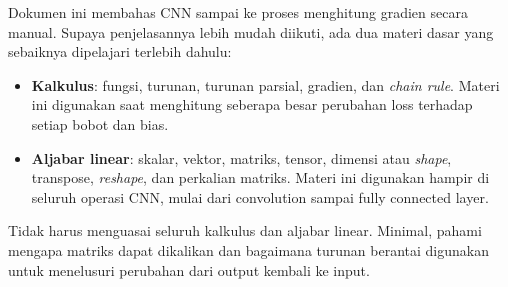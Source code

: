 \documentclass[12pt, letterpaper]{article}
\begin{document}
\begin{prasyaratbox}
Dokumen ini membahas CNN sampai ke proses menghitung gradien secara manual. Supaya penjelasannya lebih mudah diikuti, ada dua materi dasar yang sebaiknya dipelajari terlebih dahulu:
\begin{itemize}
    \item \textbf{Kalkulus}: fungsi, turunan, turunan parsial, gradien, dan \textit{chain rule}. Materi ini digunakan saat menghitung seberapa besar perubahan loss terhadap setiap bobot dan bias.
    \item \textbf{Aljabar linear}: skalar, vektor, matriks, tensor, dimensi atau \textit{shape}, transpose, \textit{reshape}, dan perkalian matriks. Materi ini digunakan hampir di seluruh operasi CNN, mulai dari convolution sampai fully connected layer.
\end{itemize}
Tidak harus menguasai seluruh kalkulus dan aljabar linear. Minimal, pahami mengapa matriks dapat dikalikan dan bagaimana turunan berantai digunakan untuk menelusuri perubahan dari output kembali ke input.
\end{prasyaratbox}
\end{document}

